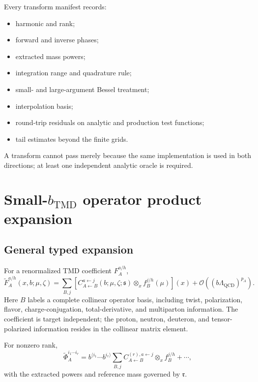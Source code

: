 \documentclass[11pt]{article}
\newcommand{\QCD}{\mathrm{QCD}}
\newcommand{\cO}{\mathcal O}
\newcommand{\otimesx}{\mathop{\otimes}_{x}}
\begin{document}
Every transform manifest records:
\begin{itemize}
\item harmonic and rank;
\item forward and inverse phases;
\item extracted mass powers;
\item integration range and quadrature rule;
\item small- and large-argument Bessel treatment;
\item interpolation basis;
\item round-trip residuals on analytic and production test functions;
\item tail estimates beyond the finite grids.
\end{itemize}
A transform cannot pass merely because the same implementation is used in
both directions; at least one independent analytic oracle is required.

\section{Small-\texorpdfstring{\(b_{\mathrm{TMD}}\)}{bTMD} operator product expansion}
\label{sec:small-b-ope}

\subsection{General typed expansion}

For a renormalized TMD coefficient \(F_A^{a/h}\),
\begin{equation}
 \widetilde F_A^{a/h}(x,b;\mu,\zeta)
 =
 \sum_{B,j}
 \left[
 C_{A\leftarrow B}^{a\leftarrow j}
 (b;\mu,\zeta;\mathfrak s)
 \otimesx
 f_B^{j/h}(\mu)
 \right](x)
 +\cO\!\left((b\Lambda_{\QCD})^{p_A}\right).
 \label{eq:generic-small-b-ope}
\end{equation}
Here \(B\) labels a complete collinear operator basis, including twist,
polarization, flavor, charge-conjugation, total-derivative, and multiparton
information.  The coefficient is target independent; the proton, neutron,
deuteron, and tensor-polarized information resides in the collinear matrix
element.

For nonzero rank,
\begin{equation}
 \widetilde\Phi_A^{i_1\cdots i_r}
 =
 b^{\langle i_1}\cdots b^{i_r\rangle}
 \sum_{B,j}
 C_{A\leftarrow B}^{(r),a\leftarrow j}
 \otimesx f_B^{j/h}
 +\cdots,
 \label{eq:ranked-small-b-ope}
\end{equation}
with the extracted powers and reference mass governed by \(\mathfrak r\).
\end{document}
